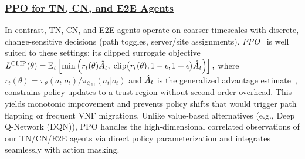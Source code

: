 \documentclass[12pt,lettersize,journal,onecolumn]{IEEEtran}
\begin{document}
\subsubsection{\underline{PPO for TN, CN, and E2E Agents}}
In contrast, TN, CN, and E2E agents operate on coarser timescales with discrete, change-sensitive decisions (path toggles, server/site assignments). \textit{PPO}~\cite{prep17schulman} is well suited to these settings: its clipped surrogate objective
$L^{\text{CLIP}}(\theta) = \mathbb{E}_t\left[\min\left(r_{t}(\theta)\Hat{A}_t,\;\text{clip}\bigl(r_{t}(\theta),1-\epsilon,1+\epsilon\bigr)\Hat{A}_t\right)\right],$
where $r_{t}(\theta)=\pi_\theta(a_t|o_t) / \pi_{\theta_{\text{old}}}(a_t|o_t)$ and $\Hat{A}_t$ is the generalized advantage estimate~\cite{prep17schulman}, constrains policy updates to a trust region without second-order overhead. This yields monotonic improvement and prevents policy shifts that would trigger path flapping or frequent VNF migrations. Unlike value-based alternatives (e.g., Deep Q-Network (DQN)), PPO handles the high-dimensional correlated observations of our TN/CN/E2E agents via direct policy parameterization and integrates seamlessly with action masking.
\end{document}
